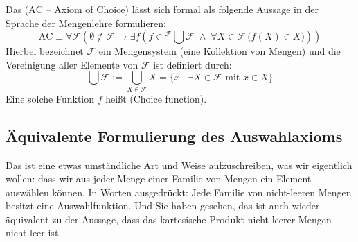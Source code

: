 \begin{math-stroke}
Das  ($\text{AC}$ -- Axiom of Choice) lässt sich formal als folgende Aussage in der Sprache der Mengenlehre formulieren:
\begin{equation}
\label{eq:axiom-of-choice}
\text{AC} \equiv \forall \mathcal{F} \left( \emptyset \notin \mathcal{F} \rightarrow \exists f \left( f \in {}^{\displaystyle\mathcal{F}}\!\bigcup \mathcal{F} \;\wedge\; \forall X \in \mathcal{F} \, \bigl( f(X) \in X \bigr) \right) \right)
\end{equation}
Hierbei bezeichnet $\mathcal{F}$ ein Mengensystem (eine Kollektion von Mengen) und die Vereinigung aller Elemente von $\mathcal{F}$ ist definiert durch:
\[
\bigcup \mathcal{F} := \bigcup_{X \in \mathcal{F}} X = \{ x \mid \exists X \in \mathcal{F} \text{ mit } x \in X \}
\]
Eine solche Funktion $f$ heißt  (Choice function).

\end{math-stroke}

\subsection{Äquivalente Formulierung des Auswahlaxioms}
\begin{spoken-clean}[00:02:40 - 00:03:50]
Das ist eine etwas umständliche Art und Weise aufzuschreiben, was wir eigentlich wollen: dass wir aus jeder Menge einer Familie von Mengen ein Element auswählen können. In Worten ausgedrückt: Jede Familie von nicht-leeren Mengen besitzt eine Auswahlfunktion. Und Sie haben gesehen, das ist auch wieder äquivalent zu der Aussage, dass das kartesische Produkt nicht-leerer Mengen nicht leer ist.
\end{spoken-clean}

\begin{math-stroke}
\end{math-stroke}

